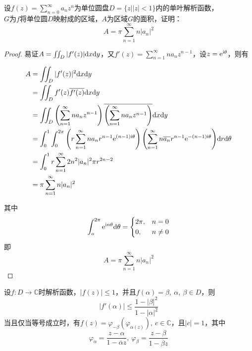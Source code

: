 \begin{proposition}
    
    设$f(z) = \sum\limits_{n=0}^{\infty}{a_nz^n}$为单位圆盘$D = \{z\big| |z| < 1\}$内的单叶解析函数，\\
    $G$为$f$将单位圆$D$映射成的区域，$A$为区域$G$的面积，证明：
    $$A =  \pi\sum\limits_{n=1}^{\infty}{n|a_n|^2}$$

\end{proposition}

\begin{proof}
    
    易证$A = \iint_{D}{|f'(z)|}\mathrm{d} x\mathrm{d} y$，又$f'(z) = \sum\limits_{n=1}^{\infty}{na_nz^{n-1}}$，设$z = \mathrm{e}^{\mathrm{i}\theta}$，则有

    \begin{align*}
        A & = \iint_{D}{|f'(z)|^2}\mathrm{d} x\mathrm{d} y \\ 
          & = \iint_{D}{f'(z)\overline{{f'(z)}}}\mathrm{d} x\mathrm{d} y \\
          & = \iint_{D}{\left(\sum\limits_{n=1}^{\infty}{na_nz^{n-1}}\right)\overline{\left(\sum\limits_{n=1}^{\infty}{na_nz^{n-1}}\right)}}\mathrm{d} x\mathrm{d} y \\
          & = \int_{0}^{1}{\int_{0}^{2 \pi}{\left(r\sum\limits_{n=1}^{\infty}{na_nr^{n-1}\mathrm{e}^{(n-1)\mathrm{i}\theta}}\right)\left(\sum\limits_{n=1}^{\infty}{n\overline{a_n}r^{n-1}\mathrm{e}^{-(n-1)\mathrm{i}\theta}}\right)}\mathrm{d} r}\mathrm{d} \theta \\
          & = \int_{0}^{1}{r\sum\limits_{n=1}^{\infty}{2n^2|a_n|^2 \pi r^{2n-2}}} \\
          & = \pi \sum\limits_{n=1}^{\infty}{n|a_n|^2}
    \end{align*}

    其中
    $$
    \int_{o}^{2\pi}{\mathrm{e}^{\mathrm{i} n\theta}}\mathrm{d} \theta = 
    \left\{
        \begin{aligned}
            &2\pi, & n=0\\
            &0, & n \neq 0\\
        \end{aligned}
    \right.
    $$
    即
    $$A = \pi \sum\limits_{n=1}^{\infty}{n|a_n|^2}$$

\end{proof}

\begin{proposition}

    设$f:D\to\mathbb{C}$时解析函数，$|f(z)| \leq 1$，并且$f(\alpha) = \beta,\ \alpha,\ \beta \in D$，则
    $$|f'(\alpha)| \leq \dfrac{1-|\beta|^2}{1-|\alpha|^2}$$
    当且仅当等号成立时，有$f(z) = \varphi_{-\beta}(\varphi_{\alpha(z)}),\ c \in \mathbb{C}$，且$|c| = 1$，其中
    $$\varphi_{\alpha} = \dfrac{z -\alpha}{1 - \overline{\alpha}{z}},\ \varphi_{\beta} = \dfrac{z -\beta}{1 - \overline{\beta}{z}}$$

\end{proposition}

